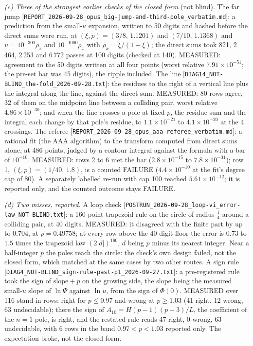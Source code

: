 \documentclass[11pt]{article}
\newcommand{\rec}[1]{\nolinkurl{#1}}
\begin{document}
\medskip
\noindent\emph{(c) Three of the strongest earlier checks of the closed form} (not blind). The far jump [\rec{REPORT_2026-09-28_opus_big-jump-and-third-pole_verbatim.md}]: a prediction from the small-$u$ expansion, written to 50 digits and hashed before the direct sums were run, at $(\xi,p)=(3/8,\,1.1201)$ and $(7/10,\,1.1368)$ and $u=10^{-300}\rho_x$ and $10^{-1000}\rho_x$ with $\rho_x=\xi/(1-\xi)$; the direct sums took 821, 2\,464, 2\,253 and 6\,772 passes at 100 digits (checked at 140). MEASURED: agreement to the 50 digits written at all four points (worst relative $7.91\times10^{-51}$; the pre-set bar was 45 digits), the ripple included. The line [\rec{DIAG14_NOT-BLIND_the-fold_2026-09-28.txt}]: the residues to the right of a vertical line plus the integral along the line, against the direct sum. MEASURED: 80 rows agree, 32 of them on the midpoint line between a colliding pair, worst relative $4.86\times10^{-30}$; and when the line crosses a pole at fixed $p$, the residue sum and the integral each change by that pole's residue, to $1.1\times10^{-21}$ to $4.1\times10^{-20}$ at the 4 crossings. The referee [\rec{REPORT_2026-09-28_opus_aaa-referee_verbatim.md}]: a rational fit (the AAA algorithm) to the transform computed from direct sums alone, at 486 points, judged by a contour integral against the formula with a bar of $10^{-10}$. MEASURED: rows 2 to 6 met the bar ($2.8\times10^{-15}$ to $7.8\times10^{-31}$); row 1, $(\xi,p)=(1/40,\,1.8)$, is a counted FAILURE ($4.4\times10^{-10}$ at the fit's degree cap of 80). A separately labelled re-run with cap 100 reached $5.61\times10^{-12}$; it is reported only, and the counted outcome stays FAILURE.

\medskip
\noindent\emph{(d) Two misses, reported.} A loop check [\rec{POSTRUN_2026-09-28_loop-vi_error-law_NOT-BLIND.txt}]: a 160-point trapezoid rule on the circle of radius $\frac14$ around a colliding pair, at 40 digits. MEASURED: it disagreed with the finite part by up to $0.704$, at $p=0.49758$; at every row above the 40-digit floor the error is $0.73$ to $1.5$ times the trapezoid law $(2|d|)^{160}$, $d$ being $p$ minus its nearest integer. Near a half-integer $p$ the poles reach the circle: the check's own design failed, not the closed form, which matched at the same cases by two other routes. A sign rule [\rec{DIAG4_NOT-BLIND_sign-rule-past-p1_2026-09-27.txt}]: a pre-registered rule took the sign of $\mathrm{slope}+p$ on the growing side, the slope being the measured small-$u$ slope of $\ln\Psi$ against $\ln u$, from the sign of $\Phi(0)$. MEASURED over 116 stand-in rows: right for $p\le0.97$ and wrong at $p\ge1.03$ (41 right, 12 wrong, 63 undecidable); there the sign of $A_{10}=H(p-1)(p+3)/L$, the coefficient of the $n=1$ pole, is right, and the restated rule reads 47 right, 0 wrong, 63 undecidable, with 6 rows in the band $0.97<p<1.03$ reported only. The expectation broke, not the closed form.
\end{document}
